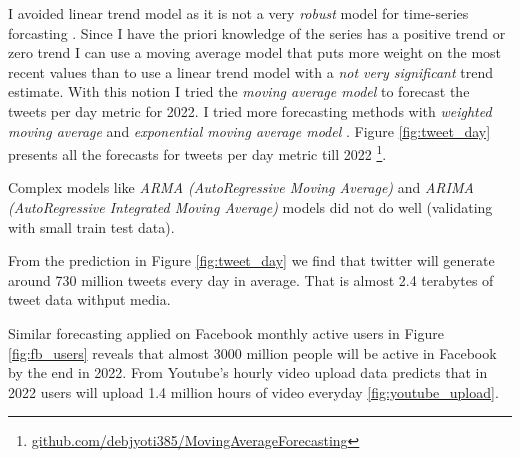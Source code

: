 I avoided linear trend model as it is not a very {\em robust} model for time-series forcasting \cite{nau2014review}. Since I have the
priori knowledge of the series has a positive trend or zero trend I can use a moving
average model that puts more weight on the most recent values than to use a linear trend model
with a {\em not very significant} trend estimate. With this notion I tried the {\em moving average model} to forecast the tweets per day metric for 2022. I tried more forecasting methods with {\em weighted moving average} and {\em exponential moving average model }. Figure \ref{fig:tweet_day} presents all the forecasts for tweets per day metric till 2022 \footnote{\href{https://github.com/debjyoti385/MovingAverageForecasting}{github.com/debjyoti385/MovingAverageForecasting}}.

Complex models like {\em ARMA (AutoRegressive Moving Average)} and {\em ARIMA (AutoRegressive  Integrated Moving Average)} models  did not do well (validating with small train test data).

From the prediction in Figure \ref{fig:tweet_day} we find that twitter will generate around 730 million tweets every day in average. That is almost 2.4 terabytes of tweet data withput media.

Similar forecasting applied on Facebook monthly active users in Figure \ref{fig:fb_users} reveals that almost 3000 million people will be active in Facebook by the end in 2022. From Youtube's hourly video upload data predicts that in 2022 users will upload 1.4 million hours of video everyday \ref{fig:youtube_upload}.




